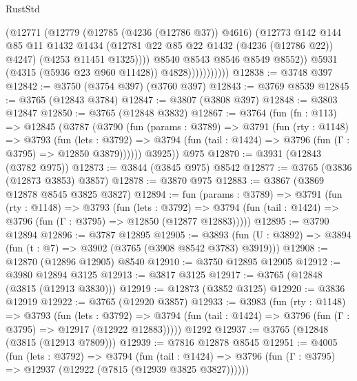 \begin{lexlean}{RustStd}
\begin{coremodule}
                              (@12771
                                (@12779
                                  (@12785 (@4236 (@12786 @37)) @4616)
                                  (@12773
                                    @142
                                    @144
                                    @85
                                    @11
                                    @1432
                                    @1434
                                    (@12781 @22 @85 @22 @1432 (@4236 (@12786 @22)) @4247)
                                    (@4253 @11451 @1325))))
                              @8540
                              @8543
                              @8546
                              @8549
                              @8552))
                          @5931
                          (@4315 (@5936 @23 @960 @11428))
                          @4828)))))))))))
@12838 := @3748 @397
@12842 := @3750 (@3754 @397) (@3760 @397)
@12843 := @3769 @8539
@12845 := @3765 (@12843 @3784)
@12847 := @3807 (@3808 @397)
@12848 := @3803 @12847
@12850 := @3765 (@12848 @3832)
@12867 := @3764
    (fun (fn : @113) =>
    @12845
      (@3787
        (@3790
          (fun (params : @3789) =>
          @3791
            (fun (rty : @1148) =>
            @3793
              (fun (lets : @3792) =>
              @3794 (fun (tail : @1424) => @3796 (fun (Γ : @3795) => @12850 @3879))))))
        @3925))
    @975
@12870 := @3931 (@12843 (@3782 @975))
@12873 := @3844 (@3845 @975) @8542
@12877 := @3765 (@3836 (@12873 @3853) @3857)
@12878 := @3870 @975
@12883 := @3867 (@3869 @12878 @8545 @3825 @3827)
@12894 := fun (params : @3789) =>
  @3791
    (fun (rty : @1148) =>
    @3793
      (fun (lets : @3792) =>
      @3794 (fun (tail : @1424) => @3796 (fun (Γ : @3795) => @12850 (@12877 @12883)))))
@12895 := @3790 @12894
@12896 := @3787 @12895
@12905 := @3893 (fun (U : @3892) => @3894 (fun (t : @7) => @3902 (@3765 (@3908 @8542 @3783) @3919)))
@12908 := @12870 (@12896 @12905) @8540
@12910 := @3750 @12895 @12905
@12912 := @3980 @12894 @3125
@12913 := @3817 @3125
@12917 := @3765 (@12848 (@3815 (@12913 @3830)))
@12919 := @12873 (@3852 @3125)
@12920 := @3836 @12919
@12922 := @3765 (@12920 @3857)
@12933 := @3983
    (fun (rty : @1148) =>
    @3793
      (fun (lets : @3792) =>
      @3794 (fun (tail : @1424) => @3796 (fun (Γ : @3795) => @12917 (@12922 @12883)))))
    @1292
@12937 := @3765 (@12848 (@3815 (@12913 @7809)))
@12939 := @7816 @12878 @8545
@12951 := @4005
    (fun (lets : @3792) =>
    @3794
      (fun (tail : @1424) =>
      @3796 (fun (Γ : @3795) => @12937 (@12922 (@7815 (@12939 @3825 @3827))))))

\end{coremodule}
\end{lexlean}
